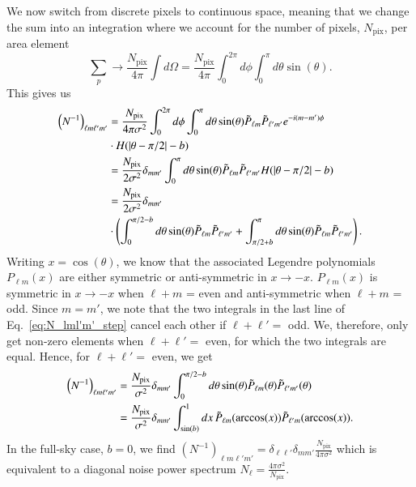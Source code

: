 \documentclass[twocolumn]{aa}
\begin{document}
We now switch from discrete pixels to continuous space, meaning that we change the sum into an integration where we account for the number of pixels, $N_{\mathrm{pix}}$, per area element
\begin{equation}
\sum_p \rightarrow \frac{N_{\mathrm{pix}}}{4\pi}\int d\Omega  = \frac{N_{\mathrm{pix}}}{4\pi}\int_{0}^{2\pi} d\phi \int_{0}^{\pi} d\theta \sin(\theta).
\end{equation}
This gives us
\begin{align}
\nonumber
\left(N^{-1}\right)_{\ell m \ell' m'} &= \frac{N_{\mathrm{pix}}}{4\pi \sigma^2}\int_{0}^{2\pi} d\phi \int_{0}^{\pi} d\theta \sin(\theta)\Tilde{P}_{\ell m}  \Tilde{P}_{\ell' m'}  e^{-i(m-m')\phi}
\\
\nonumber
&\cdot H(|\theta -\pi/2|-b)\\
\nonumber
&= \frac{N_{\mathrm{pix}}}{2\sigma^2} \delta_{mm'}\int_{0}^{\pi} d\theta \sin(\theta)\Tilde{P}_{\ell m}  \Tilde{P}_{\ell' m'} H(|\theta -\pi/2|-b)\\
\nonumber
&= \frac{N_{\mathrm{pix}}}{2\sigma^2} \delta_{mm'}\\
\label{eq:N_lml'm'_step}
&\cdot \left(\int_{0}^{\pi/2-b} d\theta \sin(\theta) \Tilde{P}_{\ell m}  \Tilde{P}_{\ell' m'}+\int_{\pi/2+b}^{\pi} d\theta \sin(\theta)\Tilde{P}_{\ell m}  \Tilde{P}_{\ell' m'}\right).
\end{align}
Writing $x=\cos(\theta)$, we know that the associated Legendre polynomials $P_{\ell m}(x)$ are either symmetric or anti-symmetric in $x\rightarrow-x$. $P_{\ell m}(x)$ is symmetric in $x \rightarrow -x$ when $\ell+m$ = even and anti-symmetric when $\ell+m$ = odd. Since $m=m'$, we note that the two integrals in the last line of Eq.~\eqref{eq:N_lml'm'_step} cancel each other if $\ell+\ell' =$ odd. We, therefore, only get non-zero elements when $\ell + \ell' =$ even, for which the two integrals are equal. Hence, for $\ell + \ell'=$ even, we get
\begin{align}
\nonumber
\left(N^{-1}\right)_{\ell m \ell' m'} &= \frac{N_{\mathrm{pix}}}{\sigma^2} \delta_{mm'}\int_{0}^{\pi/2-b} d\theta \sin(\theta)\Tilde{P}_{\ell m}(\theta)\Tilde{P}_{\ell' m'}(\theta)\\
\label{eq:finished_n_inv}
&=\frac{N_{\mathrm{pix}}}{\sigma^2} \delta_{mm'}\int_{\sin(b)}^{1} dx \, \Tilde{P}_{\ell m}(\arccos(x)) \Tilde{P}_{\ell' m}(\arccos(x)).
\end{align}
In the full-sky case, $b=0$, we find $\left(N^{-1}\right)_{\ell m \ell' m'} = \delta_{\ell \ell'}\delta_{mm'}\frac{N_{\mathrm{pix}}}{4\pi \sigma^2}$ which is equivalent to a diagonal noise power spectrum ${N_{\ell} = \frac{4\pi\sigma^2}{N_{\mathrm{pix}}}}$.
\end{document}
